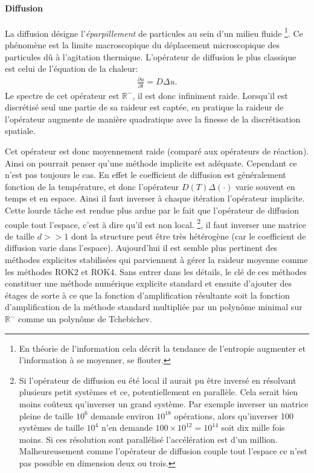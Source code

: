 \paragraph{Diffusion}
    La diffusion désigne l'\textit{éparpillement} de particules au sein d'un milieu fluide
    \footnote{En théorie de l'information cela décrit la tendance de l'entropie augmenter et l'information à se moyenner, se flouter.}.
    Ce phénomène est la limite macroscopique du déplacement microscopique
    des particules dû à l'agitation thermique. L'opérateur de diffusion le plus classique est celui de l'équation de la chaleur:
    \begin{align} \frac{\partial u}{\partial t} = D \Delta u.\end{align}
    Le spectre de cet opérateur est $\mathbb R^-$, il est donc infiniment raide. Lorsqu'il est discrétisé seul une partie de sa raideur est captée,
    en pratique la raideur de l'opérateur augmente de manière quadratique avec la finesse de la discrétisation spatiale.\par
    Cet opérateur est donc moyennement raide (comparé aux opérateurs de réaction). Ainsi on pourrait penser qu'une méthode implicite est adéquate. Cependant ce n'est pas toujours le cas.
    En effet le coefficient de diffusion est généralement fonction de la température, et donc l’opérateur $D(T) \Delta(\cdot)$ varie souvent en temps et en espace. 
    Ainsi il faut inverser à chaque itération l'opérateur implicite. Cette lourde tâche est rendue plus ardue par le fait que l'opérateur de diffusion couple tout l'espace, c'est à dire qu'il est non local.
    \footnote{Si l'opérateur de diffusion eu été local il aurait pu être inversé en résolvant plusieurs petit systèmes et ce, potentiellement en parallèle.
    Cela serait bien moins coûteux qu'inverser un grand système. 
    Par exemple inverser un matrice pleine de taille $10^6$ demande environ $10^{18}$ opérations, alors qu'inverser 100 systèmes de taille $10^4$
    n'en demande $100 \times 10^{12} = 10^{14}$ soit dix mille fois moins. Si ces résolution sont parallélisé l'accélération est d'un million. Malheureusement comme
    l'opérateur de diffusion couple tout l'espace ce n'est pas possible en dimension deux ou trois.},
    il faut inverser une matrice de taille $d >> 1$ dont la structure
    peut être très hétérogène (car le coefficient de diffusion varie dans l'espace). Aujourd'hui il est semble plus pertinent
    des méthodes explicites stabilisées qui parviennent à gérer la raideur moyenne comme les méthodes 
    ROK2 et ROK4\cite{abdulle2002fourth}. Sans entrer dans les détails, le clé de ces méthodes constituer une méthode numérique explicite standard et ensuite d'ajouter des étages 
    de sorte à ce que la fonction d'amplification résultante soit la fonction d'amplification de la méthode standard multipliée par un polynôme minimal sur $\mathbb R^-$
    comme un polynôme de Tchebichev.

